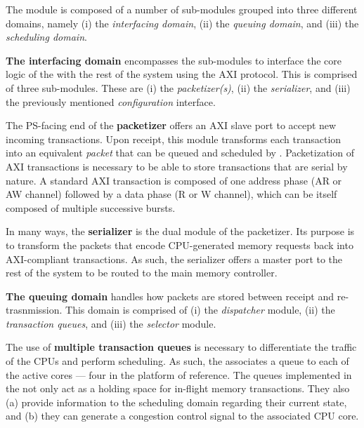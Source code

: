 The \schim module is composed of a number of sub-modules grouped into
three different domains, namely (i) the \emph{interfacing domain},
(ii) the \emph{queuing domain}, and (iii) the \emph{scheduling
  domain}.

\par{\bf The interfacing domain} encompasses the sub-modules to
interface the core logic of the \schim with the rest of the system
using the AXI protocol.  This is comprised of three sub-modules. These
are (i) the \emph{packetizer(s)}, (ii) the \emph{serializer}, and
(iii) the previously mentioned \emph{configuration} interface.

The PS-facing end of the {\bf packetizer} offers an AXI slave port to
accept new incoming transactions. Upon receipt, this module transforms
each transaction into an equivalent \emph{packet} that can be queued
and scheduled by \schim. Packetization of AXI
transactions is necessary to be able to store transactions that are
serial by nature.  A standard AXI transaction is composed of
one address phase (AR or AW channel) followed by a data phase (R or W
channel), which can be itself composed of multiple successive bursts.

In many ways, the {\bf serializer} is the dual module of the
packetizer. Its purpose is to transform the packets that encode
CPU-generated memory requests back into AXI-compliant transactions. As
such, the serializer offers a master port to the rest of the system to
be routed to the main memory controller.


\par{\bf The queuing domain} handles how packets are stored between
receipt and re-trasnmission. This domain is comprised of (i) the
\emph{dispatcher} module, (ii) the \emph{transaction queues}, and
(iii) the \emph{selector} module.

The use of {\bf multiple transaction queues} is necessary to
differentiate the traffic of the CPUs and perform scheduling. As such,
the \schim associates a queue to each of the active cores --- four in
the platform of reference.
The queues implemented in the \schim not only act as a holding space
for in-flight memory transactions.  They also (a) provide information
to the scheduling domain regarding their current state, and (b) they
can generate a congestion control signal to the associated CPU
core.

